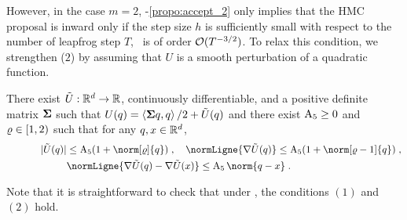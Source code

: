  However, in the case $m=2$, -\ref{propo:accept_2} only implies that the HMC proposal is inward only if the step size $h$ is sufficiently small with respect to the number of leapfrog step $T$, \ie~is of order $\mathcal O(T^{-3/2})$. To relax this condition, we strengthen ($2$) by assuming that $U$ is a smooth perturbation of a quadratic function.
 \begin{assumption}
   \label{ass:pertub}
   There exist $\tilde{U} : \mathbb{R}^d \to \mathbb{R}$, continuously differentiable, and  a positive definite matrix $\boldsymbol{\Sigma}$ such that
   $U(q) = \left\langle\boldsymbol{\Sigma} q,q \right\rangle/2 + \tilde{U}(q)$ and there exist $\operatorname{A}_5 \geq 0$ and  $\varrho \in \left[1,2\right)$  such that for any $q,x \in \mathbb{R}^d$,
   \begin{align}
     \absLigne{\tilde{U}(q)} &\leq \constfive(1+\norm[\varrho]{q}) \eqsp, \quad  \normLigne{\nabla \tilde{U}(q)} \leq \constfive(1+\norm[\varrho-1]{q}) \eqsp,\\  \qquad \qquad \qquad & \normLigne{\nabla \tilde{U}(q) - \nabla \tilde{U}(x)} \leq \constfive \norm{q-x} \eqsp.
   \end{align}
 \end{assumption}
Note that it is straightforward to check that under , the conditions $(1)$ and  $(2)$ hold.

